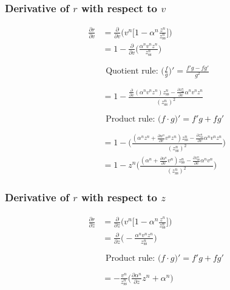 \documentclass{article}
\begin{document}
\subsubsection*{Derivative of $r$ with respect to $v$}
\begin{equation}
    \begin{aligned}
        \frac{\partial r}{\partial v} &= \frac{\partial}{\partial v} \Bigg(v^n\bigg[1-\alpha^n\frac{z^n}{z_\text{ss}^n}\bigg]\Bigg)\\
        &= 1 - \frac{\partial}{\partial v}\Bigg(\frac{\alpha^nv^nz^n}{z_\text{ss}^n}\Bigg)\\
        &\\
        &\begin{gathered}
        \text{Quotient rule: }\boxed{\Bigg(\frac{f}{g}\Bigg)' = \frac{f'g - fg'}{g^2}}
        \end{gathered}
        \\
        &\\
        &= 1 - \frac{\frac{\partial}{\partial v}(\alpha^n v^n z^n)z_\text{ss}^n - \frac{\partial z_\text{ss}^n}{\partial v}\alpha^n v^n z^n}{(z_\text{ss}^n)^2}
        \\
        &\\
        &\begin{gathered}
        \text{Product rule: }\boxed{\big(f\cdot g\big)' = f'g + fg'}
        \end{gathered}
        \\
        &\\
        &= 1-\Bigg(\frac{(\alpha^nz^n + \frac{\partial \alpha^n}{\partial v}v^nz^n)z_\text{ss}^n - \frac{\partial z_\text{ss}^n}{\partial v}\alpha^n v^nz^n}{(z_\text{ss}^n)^2}\Bigg)\\
        &= 1-z^n\Bigg(\frac{(\alpha^n+\frac{\partial \alpha^n}{\partial v}v^n)z_\text{ss}^n - \frac{\partial z_\text{ss}^n}{\partial v}\alpha^n v^n}{(z_\text{ss}^n)^2}\Bigg)
    \end{aligned}
\end{equation}
\subsubsection*{Derivative of $r$ with respect to $z$}
\begin{equation}
    \begin{aligned}
        \frac{\partial r}{\partial z} &= \frac{\partial}{\partial z} \Bigg(v^n\bigg[1-\alpha^n\frac{z^n}{z_\text{ss}^n}\bigg]\Bigg)\\
        &= \frac{\partial}{\partial z}\Bigg(-\frac{\alpha^nv^nz^n}{z_\text{ss}^n}\Bigg)
        \\
        &\\
        &\begin{gathered}
        \text{Product rule: }\boxed{\big(f\cdot g\big)' = f'g + fg'}
        \end{gathered}
        \\
        &\\
        & = -\frac{v^n}{z_\text{ss}^n}\bigg(\frac{\partial \alpha^n}{\partial z}z^n + \alpha^n\bigg)
    \end{aligned}
\end{equation}
\end{document}
